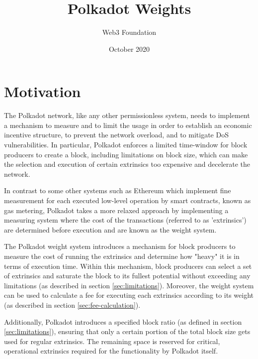 \documentclass[11pt,a4paper]{article}
\begin{document}
\title{Polkadot Weights}
\author{Web3 Foundation}
\date{October 2020}
\maketitle

\tableofcontents
\newpage

\section{Motivation}

The Polkadot network, like any other permissionless system, needs to implement a
mechanism to measure and to limit the usage in order to establish an economic
incentive structure, to prevent the network overload, and to mitigate DoS
vulnerabilities. In particular, Polkadot enforces a limited time-window for
block producers to create a block, including limitations on block size, which
can make the selection and execution of certain extrinsics too expensive and
decelerate the network.
\newline

In contrast to some other systems such as Ethereum which implement fine
measurement for each executed low-level operation by smart contracts, known as
gas metering, Polkadot takes a more relaxed approach by implementing a measuring
system where the cost of the transactions (referred to as 'extrinsics') are
determined before execution and are known as the weight system.
\newline

The Polkadot weight system introduces a mechanism for block producers to measure
the cost of running the extrinsics and determine how "heavy" it is in terms of
execution time. Within this mechanism, block producers can select a set of
extrinsics and saturate the block to its fullest potential without exceeding any
limitations (as described in section \ref{sec:limitations}). Moreover, the
weight system can be used to calculate a fee for executing each extrinsics
according to its weight (as described in section \ref{sec:fee-calculation}).
\newline

Additionally, Polkadot introduces a specified block ratio (as defined in section
\ref{sec:limitations}), ensuring that only a certain portion of the total block
size gets used for regular extrinsics. The remaining space is reserved for
critical, operational extrinsics required for the functionality by Polkadot
itself.
\newline
\end{document}
